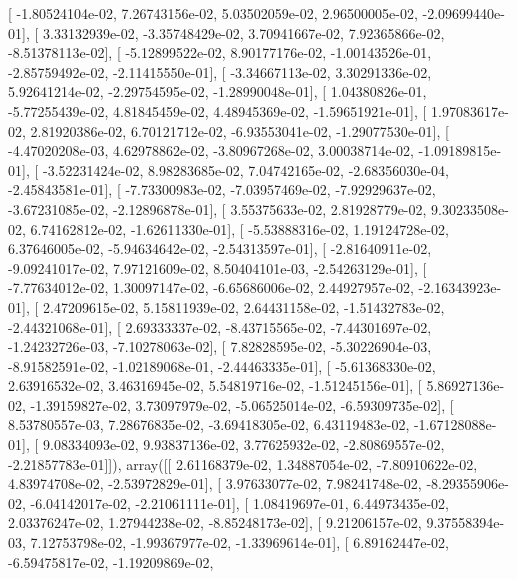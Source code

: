 \documentclass{article}
\begin{document}
       [ -1.80524104e-02,   7.26743156e-02,   5.03502059e-02,
          2.96500005e-02,  -2.09699440e-01],
       [  3.33132939e-02,  -3.35748429e-02,   3.70941667e-02,
          7.92365866e-02,  -8.51378113e-02],
       [ -5.12899522e-02,   8.90177176e-02,  -1.00143526e-01,
         -2.85759492e-02,  -2.11415550e-01],
       [ -3.34667113e-02,   3.30291336e-02,   5.92641214e-02,
         -2.29754595e-02,  -1.28990048e-01],
       [  1.04380826e-01,  -5.77255439e-02,   4.81845459e-02,
          4.48945369e-02,  -1.59651921e-01],
       [  1.97083617e-02,   2.81920386e-02,   6.70121712e-02,
         -6.93553041e-02,  -1.29077530e-01],
       [ -4.47020208e-03,   4.62978862e-02,  -3.80967268e-02,
          3.00038714e-02,  -1.09189815e-01],
       [ -3.52231424e-02,   8.98283685e-02,   7.04742165e-02,
         -2.68356030e-04,  -2.45843581e-01],
       [ -7.73300983e-02,  -7.03957469e-02,  -7.92929637e-02,
         -3.67231085e-02,  -2.12896878e-01],
       [  3.55375633e-02,   2.81928779e-02,   9.30233508e-02,
          6.74162812e-02,  -1.62611330e-01],
       [ -5.53888316e-02,   1.19124728e-02,   6.37646005e-02,
         -5.94634642e-02,  -2.54313597e-01],
       [ -2.81640911e-02,  -9.09241017e-02,   7.97121609e-02,
          8.50404101e-03,  -2.54263129e-01],
       [ -7.77634012e-02,   1.30097147e-02,  -6.65686006e-02,
          2.44927957e-02,  -2.16343923e-01],
       [  2.47209615e-02,   5.15811939e-02,   2.64431158e-02,
         -1.51432783e-02,  -2.44321068e-01],
       [  2.69333337e-02,  -8.43715565e-02,  -7.44301697e-02,
         -1.24232726e-03,  -7.10278063e-02],
       [  7.82828595e-02,  -5.30226904e-03,  -8.91582591e-02,
         -1.02189068e-01,  -2.44463335e-01],
       [ -5.61368330e-02,   2.63916532e-02,   3.46316945e-02,
          5.54819716e-02,  -1.51245156e-01],
       [  5.86927136e-02,  -1.39159827e-02,   3.73097979e-02,
         -5.06525014e-02,  -6.59309735e-02],
       [  8.53780557e-03,   7.28676835e-02,  -3.69418305e-02,
          6.43119483e-02,  -1.67128088e-01],
       [  9.08334093e-02,   9.93837136e-02,   3.77625932e-02,
         -2.80869557e-02,  -2.21857783e-01]]), array([[  2.61168379e-02,   1.34887054e-02,  -7.80910622e-02,
          4.83974708e-02,  -2.53972829e-01],
       [  3.97633077e-02,   7.98241748e-02,  -8.29355906e-02,
         -6.04142017e-02,  -2.21061111e-01],
       [  1.08419697e-01,   6.44973435e-02,   2.03376247e-02,
          1.27944238e-02,  -8.85248173e-02],
       [  9.21206157e-02,   9.37558394e-03,   7.12753798e-02,
         -1.99367977e-02,  -1.33969614e-01],
       [  6.89162447e-02,  -6.59475817e-02,  -1.19209869e-02,
\end{document}
